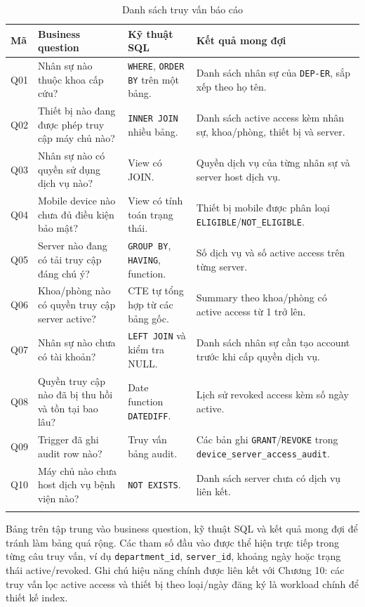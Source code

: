 \documentclass[12pt, a4paper, oneside, openany]{report}
\newcommand{\dbid}[1]{{\normalfont\ttfamily\footnotesize\nolinkurl{#1}}}
\begin{document}
\begin{longtable}{|L{1.1cm}|L{4.4cm}|L{3.2cm}|L{4.5cm}|}
\hline
\textbf{Mã} & \textbf{Business question} & \textbf{Kỹ thuật SQL} & \textbf{Kết quả mong đợi} \\
\hline
Q01 & Nhân sự nào thuộc khoa cấp cứu? & \texttt{WHERE}, \texttt{ORDER BY} trên một bảng. & Danh sách nhân sự của \dbid{DEP-ER}, sắp xếp theo họ tên. \\
\hline
Q02 & Thiết bị nào đang được phép truy cập máy chủ nào? & \texttt{INNER JOIN} nhiều bảng. & Danh sách active access kèm nhân sự, khoa/phòng, thiết bị và server. \\
\hline
Q03 & Nhân sự nào có quyền sử dụng dịch vụ nào? & View có JOIN. & Quyền dịch vụ của từng nhân sự và server host dịch vụ. \\
\hline
Q04 & Mobile device nào chưa đủ điều kiện bảo mật? & View có tính toán trạng thái. & Thiết bị mobile được phân loại \dbid{ELIGIBLE}/\dbid{NOT_ELIGIBLE}. \\
\hline
Q05 & Server nào đang có tải truy cập đáng chú ý? & \texttt{GROUP BY}, \texttt{HAVING}, function. & Số dịch vụ và số active access trên từng server. \\
\hline
Q06 & Khoa/phòng nào có quyền truy cập server active? & CTE tự tổng hợp từ các bảng gốc. & Summary theo khoa/phòng có active access từ 1 trở lên. \\
\hline
Q07 & Nhân sự nào chưa có tài khoản? & \texttt{LEFT JOIN} và kiểm tra NULL. & Danh sách nhân sự cần tạo account trước khi cấp quyền dịch vụ. \\
\hline
Q08 & Quyền truy cập nào đã bị thu hồi và tồn tại bao lâu? & Date function \texttt{DATEDIFF}. & Lịch sử revoked access kèm số ngày active. \\
\hline
Q09 & Trigger đã ghi audit row nào? & Truy vấn bảng audit. & Các bản ghi \dbid{GRANT}/\dbid{REVOKE} trong \dbid{device_server_access_audit}. \\
\hline
Q10 & Máy chủ nào chưa host dịch vụ bệnh viện nào? & \texttt{NOT EXISTS}. & Danh sách server chưa có dịch vụ liên kết. \\
\hline
\caption{Danh sách truy vấn báo cáo}
\end{longtable}

\noindent Bảng trên tập trung vào business question, kỹ thuật SQL và kết quả mong đợi để tránh làm bảng quá rộng. Các tham số đầu vào được thể hiện trực tiếp trong từng câu truy vấn, ví dụ \dbid{department_id}, \dbid{server_id}, khoảng ngày hoặc trạng thái active/revoked. Ghi chú hiệu năng chính được liên kết với Chương 10: các truy vấn lọc active access và thiết bị theo loại/ngày đăng ký là workload chính để thiết kế index.
\end{document}
